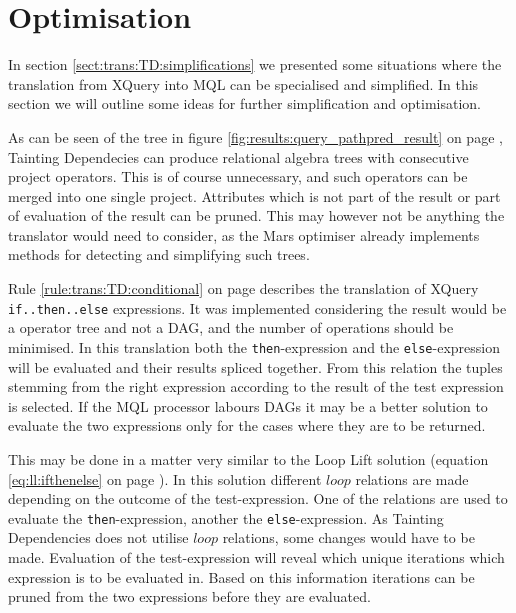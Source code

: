 \section{Optimisation}
\label{sect:disc:optimisations}

In section \ref{sect:trans:TD:simplifications} we presented some situations where the translation from XQuery into
MQL can be specialised and simplified. In this section we will outline some ideas for further simplification and
optimisation.

As can be seen of the tree in figure \ref{fig:results:query_pathpred_result} on page
\pageref{fig:results:query_pathpred_result}, Tainting Dependecies can produce relational algebra trees with
consecutive \textsf{project} operators. This is of course unnecessary, and such operators can be merged into one
single \textsf{project}. Attributes which is not part of the result or part of evaluation of the result can be
pruned. This may however not be anything the translator would need to consider, as the Mars optimiser already
implements methods for detecting and simplifying such trees.

Rule \ref{rule:trans:TD:conditional} on page \pageref{rule:trans:TD:conditional} describes the translation of
XQuery \texttt{if..then..else} expressions. It was implemented considering the result would be a operator tree and
not a DAG, and the number of operations should be minimised. In this translation both the \texttt{then}-expression
and the \texttt{else}-expression will be evaluated and their results spliced together. From this relation the
tuples stemming from the right expression according to the result of the test expression is selected. If the MQL
processor labours DAGs it may be a better solution to evaluate the two expressions only for the cases where they
are to be returned. 

This may be done in a matter very similar to the Loop Lift solution (equation
\ref{eq:ll:ifthenelse} on page \pageref{eq:ll:ifthenelse}). In this solution different $loop$ relations are made
depending on the outcome of the test-expression. One of the relations are used to evaluate the
\texttt{then}-expression, another the \texttt{else}-expression. As Tainting Dependencies does not utilise $loop$
relations, some changes would have to be made. Evaluation of the test-expression will reveal which unique
iterations which expression is to be evaluated in. Based on this information iterations can be pruned from the two
expressions before they are evaluated.


